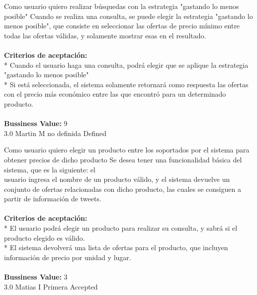 \vspace{20pt}

	{Como usuario quiero realizar búsquedas con la estrategia "gastando lo menos posible"} %
	{Cuando se realiza una consulta, se puede elegir la estrategia "gastando lo\\
menos posible", que consiste en seleccionar las ofertas de precio mínimo entre\\
todas las ofertas válidas, y solamente mostrar esas en el resultado.\\
  \\
\textbf{Criterios de aceptación:}\\
* Cuando el usuario haga una consulta, podrá elegir que se aplique la estrategia "gastando lo menos posible"  \\
* Si está seleccionada, el sistema solamente retornará como respuesta las ofertas con el precio más económico entre las que encontró para un determinado producto. \\
  \\
\textbf{Bussiness Value:} 9\\
} %
	{} %
	{3.0} %
	{Martin M} %
	{no definida} %
	{Defined} %


\vspace{20pt}

	{Como usuario quiero elegir un producto entre los soportados por el sistema para obtener precios de dicho producto} %
	{Se desea tener una funcionalidad básica del sistema, que es la siguiente: el\\
usuario ingresa el nombre de un producto válido, y el sistema devuelve un\\
conjunto de ofertas relacionadas con dicho producto, las cuales se consiguen a\\
partir de información de tweets.\\
  \\
\textbf{Criterios de aceptación:}\\
* El usuario podrá elegir un producto para realizar su consulta, y sabrá si el producto elegido es válido.  \\
* El sistema devolverá una lista de ofertas para el producto, que incluyen información de precio por unidad y lugar. \\
  \\
\textbf{Bussiness Value:} 3\\
} %
	{} %
	{3.0} %
	{Matias I} %
	{Primera} %
	{Accepted} %

